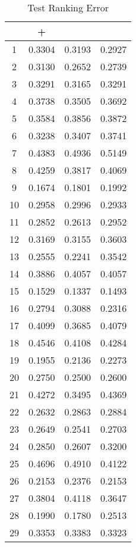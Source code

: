 \begin{table}[ht]\footnotesize
\centering
\caption{Test Ranking Error}
\label{Table:mil_test_error}
\begin{tabular}{|c|c|c|c|}
  \hline
          &\RB{}+  &  \CRB{}  &  \RB{}\\ 
  \hline
1  &  0.3304   &  0.3193   &  0.2927 \\ 
2  &  0.3130   &  0.2652   &  0.2739 \\ 
3  &  0.3291   &  0.3165   &  0.3291 \\ 
4  &  0.3738   &  0.3505   &  0.3692 \\ 
5  &  0.3584   &  0.3856   &  0.3872 \\ 
6  &  0.3238   &  0.3407   &  0.3741 \\ 
7  &  0.4383   &  0.4936   &  0.5149 \\ 
8  &  0.4259   &  0.3817   &  0.4069 \\ 
9  &  0.1674   &  0.1801   &  0.1992 \\ 
10  &  0.2958   &  0.2996   &  0.2933 \\ 
11  &  0.2852   &  0.2613   &  0.2952 \\ 
12  &  0.3169   &  0.3155   &  0.3603 \\ 
13  &  0.2555   &  0.2241   &  0.3542 \\ 
14  &  0.3886   &  0.4057   &  0.4057 \\ 
15  &  0.1529   &  0.1337   &  0.1493 \\ 
16  &  0.2794   &  0.3088   &  0.2316 \\ 
17  &  0.4099   &  0.3685   &  0.4079 \\ 
18  &  0.4546   &  0.4108   &  0.4284 \\ 
19  &  0.1955   &  0.2136   &  0.2273 \\ 
20  &  0.2750   &  0.2500   &  0.2600 \\ 
21  &  0.4272   &  0.3495   &  0.4369 \\ 
22  &  0.2632   &  0.2863   &  0.2884 \\ 
23  &  0.2649   &  0.2541   &  0.2703 \\ 
24  &  0.2850   &  0.2607   &  0.3200 \\ 
25  &  0.4696   &  0.4910   &  0.4122 \\ 
26  &  0.2153   &  0.2376   &  0.2153 \\ 
27  &  0.3804   &  0.4118   &  0.3647 \\ 
28  &  0.1990   &  0.1780   &  0.2513 \\ 
29  &  0.3353   &  0.3383   &  0.3323 \\ 

\end{tabular}
\end{table}
